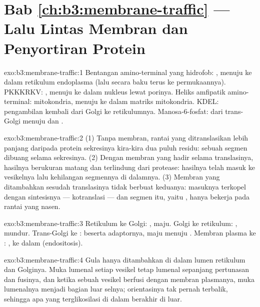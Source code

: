 \section*{Bab \ref{ch:b3:membrane-traffic} --- Lalu Lintas Membran dan Penyortiran Protein}

\begin{solution}{exo:b3:membrane-traffic:1}
Bentangan amino-terminal yang hidrofob: , menuju ke dalam
retikulum endoplasma (lalu secara baku terus ke permukaannya). PKKKRKV:
, menuju ke dalam nukleus lewat porinya.
Heliks amfipatik amino-terminal:  mitokondria, menuju ke dalam
matriks mitokondria. KDEL: pengambilan kembali dari Golgi ke
retikulumnya. Manosa-6-fosfat: dari trans-Golgi menuju 
dan .
\end{solution}

\begin{solution}{exo:b3:membrane-traffic:2}
(1) Tanpa membran, rantai yang ditranslasikan lebih panjang daripada protein
sekresinya kira-kira dua puluh residu: sebuah segmen dibuang selama
sekresinya. (2) Dengan membran yang hadir selama translasinya, hasilnya
berukuran matang dan terlindung dari protease: hasilnya telah masuk ke
vesikelnya lalu kehilangan segmennya di dalamnya. (3) Membran yang ditambahkan
sesudah translasinya tidak berbuat keduanya: masuknya terkopel dengan
sintesisnya --- kotranslasi --- dan segmen itu, yaitu , hanya
bekerja pada rantai yang nasen.
\end{solution}

\begin{solution}{exo:b3:membrane-traffic:3}
Retikulum ke Golgi: , maju. Golgi ke retikulum: ,
mundur. Trans-Golgi ke :  beserta adaptornya,
maju menuju . Membran plasma ke : ,
ke dalam (endositosis).
\end{solution}

\begin{solution}{exo:b3:membrane-traffic:4}
Gula hanya ditambahkan di dalam lumen retikulum dan Golginya. Muka
lumenal setiap vesikel tetap lumenal sepanjang pertunasan dan fusinya,
dan ketika sebuah vesikel berfusi dengan membran plasmanya, muka lumenalnya
menjadi bagian luar selnya; orientasinya tak pernah terbalik, sehingga
apa yang terglikosilasi di dalam berakhir di luar.
\end{solution}

